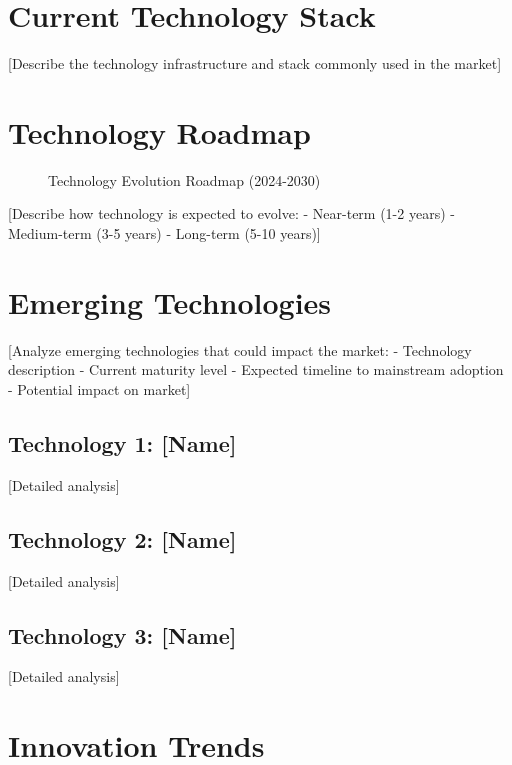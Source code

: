 \documentclass[11pt,letterpaper]{report}
\begin{document}
\section{Current Technology Stack}

[Describe the technology infrastructure and stack commonly used in the market]

\section{Technology Roadmap}


\begin{figure}[htbp]
\centering
\caption{Technology Evolution Roadmap (2024-2030)}
\label{fig:tech_roadmap}
\end{figure}

[Describe how technology is expected to evolve:
- Near-term (1-2 years)
- Medium-term (3-5 years)
- Long-term (5-10 years)]

\section{Emerging Technologies}

[Analyze emerging technologies that could impact the market:
- Technology description
- Current maturity level
- Expected timeline to mainstream adoption
- Potential impact on market]

\subsection{Technology 1: [Name]}
[Detailed analysis]

\subsection{Technology 2: [Name]}
[Detailed analysis]

\subsection{Technology 3: [Name]}
[Detailed analysis]

\section{Innovation Trends}

\end{document}
